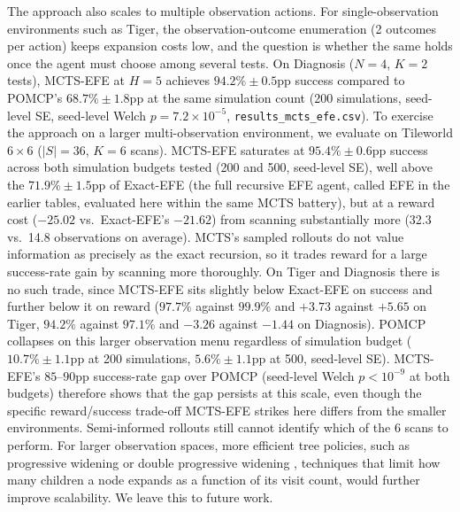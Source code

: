 The approach also scales to multiple observation actions. For single-observation environments such as Tiger, the observation-outcome enumeration (2 outcomes per action) keeps expansion costs low, and the question is whether the same holds once the agent must choose among several tests. On Diagnosis ($N{=}4$, $K{=}2$ tests), MCTS-EFE at $H{=}5$ achieves $94.2\% \pm 0.5$pp success compared to POMCP's $68.7\% \pm 1.8$pp at the same simulation count (200 simulations, seed-level SE, seed-level Welch $p{=}7.2{\times}10^{-5}$, \texttt{results\_\allowbreak mcts\_\allowbreak efe.csv}). To exercise the approach on a larger multi-observation environment, we evaluate on Tileworld $6{\times}6$ ($|S|{=}36$, $K{=}6$ scans). MCTS-EFE saturates at $95.4\% \pm 0.6$pp success across both simulation budgets tested (200 and 500, seed-level SE), well above the $71.9\% \pm 1.5$pp of Exact-EFE (the full recursive EFE agent, called EFE in the earlier tables, evaluated here within the same MCTS battery), but at a reward cost ($-25.02$ vs.\ Exact-EFE's $-21.62$) from scanning substantially more (32.3 vs.\ 14.8 observations on average). MCTS's sampled rollouts do not value information as precisely as the exact recursion, so it trades reward for a large success-rate gain by scanning more thoroughly. On Tiger and Diagnosis there is no such trade, since MCTS-EFE sits slightly below Exact-EFE on success and further below it on reward ($97.7\%$ against $99.9\%$ and $+3.73$ against $+5.65$ on Tiger, $94.2\%$ against $97.1\%$ and $-3.26$ against $-1.44$ on Diagnosis). POMCP collapses on this larger observation menu regardless of simulation budget ($10.7\% \pm 1.1$pp at 200 simulations, $5.6\% \pm 1.1$pp at 500, seed-level SE). MCTS-EFE's $85$--$90$pp success-rate gap over POMCP (seed-level Welch $p<10^{-9}$ at both budgets) therefore shows that the gap persists at this scale, even though the specific reward/success trade-off MCTS-EFE strikes here differs from the smaller environments. Semi-informed rollouts still cannot identify which of the 6 scans to perform. For larger observation spaces, more efficient tree policies, such as progressive widening or double progressive widening \citep{benchetrit2025}, techniques that limit how many children a node expands as a function of its visit count, would further improve scalability. We leave this to future work.
